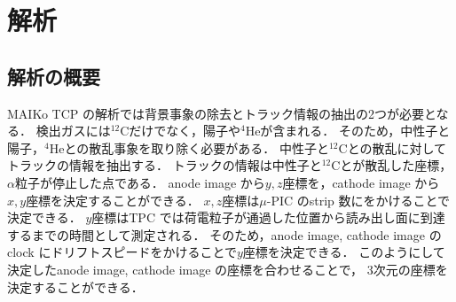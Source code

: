 \documentclass[../master]{subfiles}
\begin{document}
\chapter{解析}
%
%
%
\section{解析の概要}
MAIKo TCP の解析では背景事象の除去とトラック情報の抽出の2つが必要となる．
検出ガスには${}^{12}\mathrm{C}$だけでなく，陽子や${}^{4}\mathrm{He}$が含まれる．
そのため，中性子と陽子，${}^{4}\mathrm{He}$との散乱事象を取り除く必要がある．
中性子と${}^{12}\mathrm{C}$との散乱に対してトラックの情報を抽出する．
トラックの情報は中性子と${}^{12}\mathrm{C}$とが散乱した座標，
$\alpha$粒子が停止した点である．
anode image から$y, z$座標を，cathode image から$x, y$座標を決定することができる．
$x, z$座標は$\mu$-PIC のstrip 数にをかけることで決定できる．
$y$座標はTPC では荷電粒子が通過した位置から読み出し面に到達するまでの時間として測定される．
そのため，anode image, cathode image のclock にドリフトスピードをかけることで$y$座標を決定できる．
このようにして決定したanode image, cathode image の座標を合わせることで，
3次元の座標を決定することができる．
\end{document}
